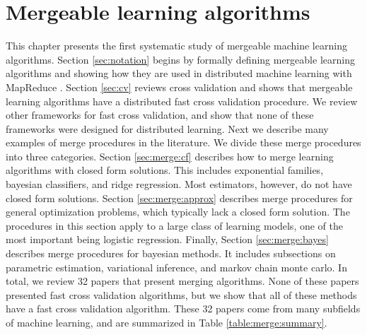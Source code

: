 \documentclass[thesis.tex]{subfiles}
\begin{document}
\chapter{Mergeable learning algorithms}

\noindent
This chapter presents the first systematic study of mergeable machine learning algorithms.
Section \ref{sec:notation} begins by formally defining mergeable learning algorithms 
and showing how they are used in distributed machine learning with MapReduce \citep{dean2008mapreduce}.
Section \ref{sec:cv} reviews cross validation and shows that mergeable learning algorithms have a distributed fast cross validation procedure. 
We review other frameworks for fast cross validation,
and show that none of these frameworks were designed for distributed learning.
Next we describe many examples of merge procedures in the literature.
We divide these merge procedures into three categories.
Section \ref{sec:merge:cf} describes how to merge learning algorithms with closed form solutions.
This includes exponential families, bayesian classifiers, and ridge regression.
Most estimators, however, do not have closed form solutions.
Section \ref{sec:merge:approx} describes merge procedures for general optimization problems,
which typically lack a closed form solution.
The procedures in this section apply to a large class of learning models,
one of the most important being logistic regression.
Finally, Section \ref{sec:merge:bayes} describes merge procedures for bayesian methods.
It includes subsections on parametric estimation, variational inference, and markov chain monte carlo.
In total, we review 32 papers that present merging algorithms.
None of these papers presented fast cross validation algorithms,
but we show that all of these methods have a fast cross validation algorithm.
These 32 papers come from many subfields of machine learning,
and are summarized in Table \ref{table:merge:summary}.
\end{document}
